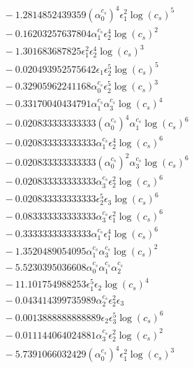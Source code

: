 \documentclass[10pt]{article}
\begin{document}
\begin{align*}
&{}  - 1.2814852439359 \left(\alpha_{0}^{c_s}\right)^{4} \epsilon_{1}^{2} \log{\left(c_{s} \right)}^{5} \\
&{}  - 0.16203257637804 \alpha_{1}^{c_s} \epsilon_{2}^{4} \log{\left(c_{s} \right)}^{2} \\
&{}  - 1.301683687825 \epsilon_{1}^{2} \epsilon_{2}^{4} \log{\left(c_{s} \right)}^{3} \\
&{}  - 0.020493952575642 \epsilon_{1} \epsilon_{2}^{5} \log{\left(c_{s} \right)}^{5} \\
&{}  - 0.32905962241168 \alpha_{0}^{c_s} \epsilon_{2}^{5} \log{\left(c_{s} \right)}^{3} \\
&{}  - 0.33170040434791 \alpha_{1}^{c_s} \alpha_{3}^{c_s} \log{\left(c_{s} \right)}^{4} \\
&{}  - 0.020833333333333 \left(\alpha_{0}^{c_s}\right)^{4} \alpha_{1}^{c_s} \log{\left(c_{s} \right)}^{6} \\
&{}  - 0.020833333333333 \alpha_{1}^{c_s} \epsilon_{2}^{4} \log{\left(c_{s} \right)}^{6} \\
&{}  - 0.020833333333333 \left(\alpha_{0}^{c_s}\right)^{2} \alpha_{3}^{c_s} \log{\left(c_{s} \right)}^{6} \\
&{}  - 0.020833333333333 \alpha_{3}^{c_s} \epsilon_{2}^{2} \log{\left(c_{s} \right)}^{6} \\
&{}  - 0.020833333333333 \epsilon_{2}^{5} \epsilon_{3} \log{\left(c_{s} \right)}^{6} \\
&{}  - 0.083333333333333 \alpha_{3}^{c_s} \epsilon_{1}^{2} \log{\left(c_{s} \right)}^{6} \\
&{}  - 0.33333333333333 \alpha_{1}^{c_s} \epsilon_{1}^{4} \log{\left(c_{s} \right)}^{6} \\
&{}  - 1.3520489054095 \alpha_{1}^{c_s} \alpha_{3}^{c_s} \log{\left(c_{s} \right)}^{2} \\
&{}  - 5.5230395036608 \alpha_{0}^{c_s} \alpha_{1}^{c_s} \alpha_{2}^{c_s} \\
&{}  - 11.101754988253 \epsilon_{1}^{5} \epsilon_{2} \log{\left(c_{s} \right)}^{4} \\
&{}  - 0.043414399735989 \alpha_{2}^{c_s} \epsilon_{2}^{2} \epsilon_{3} \\
&{}  - 0.0013888888888889 \epsilon_{2} \epsilon_{3}^{5} \log{\left(c_{s} \right)}^{6} \\
&{}  - 0.011144064024881 \alpha_{3}^{c_s} \epsilon_{2}^{2} \log{\left(c_{s} \right)}^{2} \\
&{}  - 5.7391066032429 \left(\alpha_{0}^{c_s}\right)^{4} \epsilon_{1}^{2} \log{\left(c_{s} \right)}^{3} \\

\end{align*}
\end{document}

